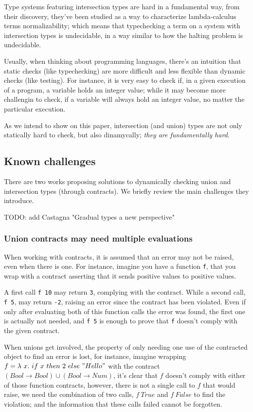 Type systems featuring intersection types are hard in a fundamental way,
from their discovery, they've been studied as a way to characterize
lambda-calculus terms normalizability; which means that typechecking a
term on a system with intersection types is undecidable, in a way
similar to how the halting problem is undecidable.

Usually, when thinking about programming languages, there's an intuition
that static checks (like typechecking) are more difficult and less flexible
than dynamic checks (like testing). For instance, it is very easy to check if,
in a given execution of a program, a variable holds an integer value; while it
may become more challengin to check, if a variable will always hold an integer value,
no matter the particular execution.

As we intend to show on this paper, intersection (and union) types are not only
statically hard to check, but also dinamycally; \textit{they are fundamentally hard}.

\subsection{Known challenges}

There are two works proposing solutions to dynamically checking union and intersection
types (through contracts). We briefly review the main challenges they introduce.

TODO: add Castagna "Gradual types a new perspective"

\subsubsection*{Union contracts may need multiple evaluations}

When working with contracts, it is assumed that an error may not be raised, even
when there is one. For instance, imagine you have a function \texttt{f}, that
you wrap with a contract asserting that it sends positive values to positive values.

A first call \texttt{f 10} may return \texttt{3}, complying with the contract.
While a second call, \texttt{f 5}, may return \texttt{-2}, raising an error since
the contract has been violated. Even if only after evaluating both of this function calls
the error was found, the first one is actually not needed, and \texttt{f 5} is enough to
prove that \texttt{f} doesn't comply with the given contract.

When unions get involved, the property of only needing one use of the contracted object
to find an error is lost,
for instance, imagine wrapping $f = \lambda~x.~if~x~then~2~else~"Hello"$
with the contract $(Bool \rightarrow Bool) \cup (Bool \rightarrow Num)$, it's
clear that $f$ doesn't comply with either of those function contracts, however, there
is not a single call to $f$ that would raise, we need the combination of two calls,
$f~True$ and $f~False$ to find the violation; and the information that these calls failed
cannot be forgotten.

